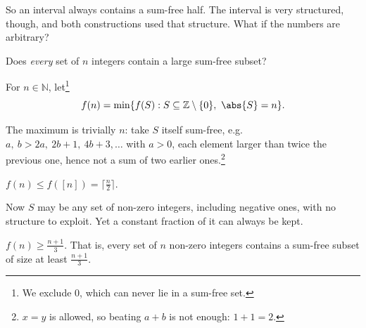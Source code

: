 So an interval always contains a sum-free half. The interval is very structured, though, and both constructions used that structure. What if the numbers are arbitrary?

\begin{question}
    Does \emph{every} set of \(n\) integers contain a large sum-free subset?
\end{question}

\begin{definition}
    For \(n \in \mathbb{N}\), let\footnote{We exclude \(0\), which can never lie in a sum-free set.}
    \[
        f(n) = \min\{ f(S) : S \subseteq \mathbb{Z} \setminus \{0\},\ \abs{S} = n \}.
    \]
\end{definition}

\begin{remark}
    The maximum is trivially \(n\): take \(S\) itself sum-free, e.g.\ \(a,\ b > 2a,\ 2b + 1,\ 4b + 3, \ldots\) with \(a > 0\), each element larger than twice the previous one, hence not a sum of two earlier ones.\footnote{\(x = y\) is allowed, so beating \(a + b\) is not enough: \(1 + 1 = 2\).}
\end{remark}

\begin{observation}
    \(f(n) \le f([n]) = \lceil \frac{n}{2} \rceil\).
\end{observation}

Now \(S\) may be any set of non-zero integers, including negative ones, with no structure to exploit. Yet a constant fraction of it can always be kept.

\begin{theorem}[Erd\H{o}s, 1965]\label{thm:sum-free}
    \(f(n) \ge \frac{n+1}{3}\). That is, every set of \(n\) non-zero integers contains a sum-free subset of size at least \(\frac{n+1}{3}\).
\end{theorem}

